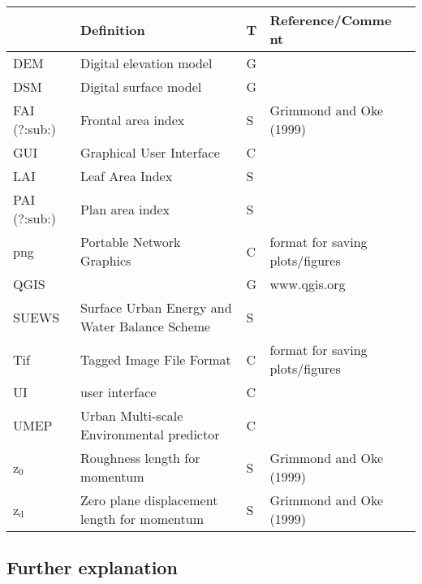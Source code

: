 \documentclass[letterpaper,10pt,english]{sphinxmanual}
\begin{document}
\begin{savenotes}\sphinxattablestart
\centering
\begin{tabulary}{\linewidth}[t]{|T|T|T|T|}
\hline
\sphinxstyletheadfamily &\sphinxstyletheadfamily 
Definition
&\sphinxstyletheadfamily 
T
&\sphinxstyletheadfamily 
Reference/Comme
nt
\\
\hline
DEM
&
Digital
elevation model
&
G
&\\
\hline
DSM
&
Digital surface
model
&
G
&\\
\hline
FAI (?:sub:)
&
Frontal area
index
&
S
&
Grimmond and
Oke (1999)
\\
\hline
GUI
&
Graphical User
Interface
&
C
&\\
\hline
LAI
&
Leaf Area Index
&
S
&\\
\hline
PAI (?:sub:)
&
Plan area index
&
S
&\\
\hline
png
&
Portable
Network
Graphics
&
C
&
format for
saving
plots/figures
\\
\hline
QGIS
&&
G
&
www.qgis.org
\\
\hline
SUEWS
&
Surface Urban
Energy and
Water Balance
Scheme
&
S
&\\
\hline
Tif
&
Tagged Image
File Format
&
C
&
format for
saving
plots/figures
\\
\hline
UI
&
user interface
&
C
&\\
\hline
UMEP
&
Urban
Multi-scale
Environmental
predictor
&
C
&\\
\hline
z$_{\text{0}}$
&
Roughness
length for
momentum
&
S
&
Grimmond and
Oke (1999)
\\
\hline
z$_{\text{d}}$
&
Zero plane
displacement
length for
momentum
&
S
&
Grimmond and
Oke (1999)
\\
\hline
\end{tabulary}
\par
\sphinxattableend\end{savenotes}


\subsection{Further explanation}
\label{\detokenize{Tutorials/IntroductionToSuews:further-explanation}}
\end{document}
